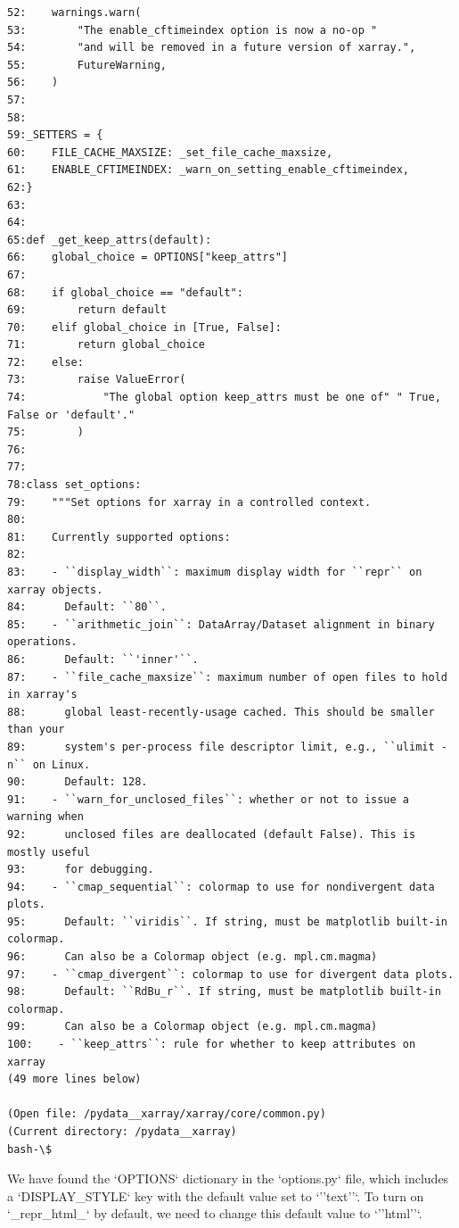 {\begin{observationbox}
\begin{Verbatim}[breaklines=true, breakanywhere=true]
52:    warnings.warn(
53:        "The enable_cftimeindex option is now a no-op "
54:        "and will be removed in a future version of xarray.",
55:        FutureWarning,
56:    )
57:
58:
59:_SETTERS = {
60:    FILE_CACHE_MAXSIZE: _set_file_cache_maxsize,
61:    ENABLE_CFTIMEINDEX: _warn_on_setting_enable_cftimeindex,
62:}
63:
64:
65:def _get_keep_attrs(default):
66:    global_choice = OPTIONS["keep_attrs"]
67:
68:    if global_choice == "default":
69:        return default
70:    elif global_choice in [True, False]:
71:        return global_choice
72:    else:
73:        raise ValueError(
74:            "The global option keep_attrs must be one of" " True, False or 'default'."
75:        )
76:
77:
78:class set_options:
79:    """Set options for xarray in a controlled context.
80:
81:    Currently supported options:
82:
83:    - ``display_width``: maximum display width for ``repr`` on xarray objects.
84:      Default: ``80``.
85:    - ``arithmetic_join``: DataArray/Dataset alignment in binary operations.
86:      Default: ``'inner'``.
87:    - ``file_cache_maxsize``: maximum number of open files to hold in xarray's
88:      global least-recently-usage cached. This should be smaller than your
89:      system's per-process file descriptor limit, e.g., ``ulimit -n`` on Linux.
90:      Default: 128.
91:    - ``warn_for_unclosed_files``: whether or not to issue a warning when
92:      unclosed files are deallocated (default False). This is mostly useful
93:      for debugging.
94:    - ``cmap_sequential``: colormap to use for nondivergent data plots.
95:      Default: ``viridis``. If string, must be matplotlib built-in colormap.
96:      Can also be a Colormap object (e.g. mpl.cm.magma)
97:    - ``cmap_divergent``: colormap to use for divergent data plots.
98:      Default: ``RdBu_r``. If string, must be matplotlib built-in colormap.
99:      Can also be a Colormap object (e.g. mpl.cm.magma)
100:    - ``keep_attrs``: rule for whether to keep attributes on xarray
(49 more lines below)

(Open file: /pydata__xarray/xarray/core/common.py)
(Current directory: /pydata__xarray)
bash-\$
\end{Verbatim}
\end{observationbox}
\begin{agentbox}
We have found the `OPTIONS` dictionary in the `options.py` file, which includes a `DISPLAY\_STYLE` key with the default value set to `''text''`. To turn on `\_repr\_html\_` by default, we need to change this default value to `''html''`.




\end{agentbox}}
